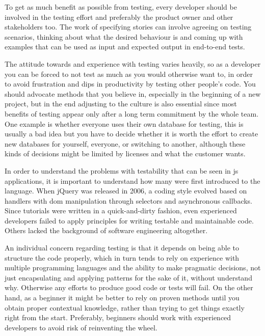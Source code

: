 \documentclass[11pt]{article}
\begin{document}
To get as much benefit as possible from testing, every developer should be involved in the testing effort and preferably the product owner and other stakeholders too. The work of specifying stories can involve agreeing on testing scenarios, thinking about what the desired behaviour is and coming up with examples that can be used as input and expected output in end-to-end tests. \cite[questions~39-40]{Edelstam}\cite[question~30]{Stenmark}

The attitude towards and experience with testing varies heavily, so as a developer you can be forced to not test as much as you would otherwise want to, in order to avoid frustration and dips in productivity by testing other people's code. You should advocate methods that you believe in, especially in the beginning of a new project, but in the end adjusting to the culture is also essential since most benefits of testing appear only after a long term commitment by the whole team. One example is whether everyone uses their own database for testing, this is usually a bad idea but you have to decide whether it is worth the effort to create new databases for yourself, everyone, or switching to another, although these kinds of decisions might be limited by licenses and what the customer wants. \cite[questions~31-32]{Stenmark}\cite[question~36]{Ahnve}

In order to understand the problems with testability that can be seen in \gls{js} applications, it is important to understand how many were first introduced to the language. When jQuery was released in 2006, a coding style evolved based on handlers with \gls{dom} manipulation through selectors and asynchronous callbacks. Since tutorials were written in a quick-and-dirty fashion, even experienced developers failed to apply principles for writing testable and maintainable code. Others lacked the background of software engineering altogether. \cite[question~10]{Stenmark}

An individual concern regarding testing is that it depends on being able to structure the code properly, which in turn tends to rely on experience with multiple programming languages and the ability to make pragmatic decisions, not just encapsulating and applying patterns for the sake of it, without understand why. Otherwise any efforts to produce good code or tests will fail. %
On the other hand, as a beginner it might be better to rely on proven methods until you obtain proper contextual knowledge, rather than trying to get things exactly right from the start. Preferably, beginners should work with experienced developers to avoid risk of reinventing the wheel. \cite[questions~23-24]{Ahnve}
\end{document}
